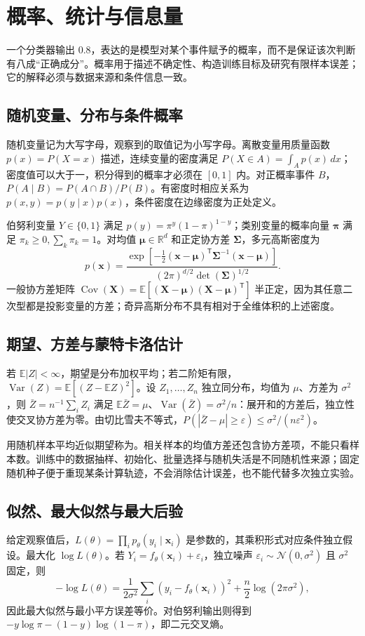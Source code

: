 \documentclass[UTF8,12pt,a4paper,fontset=fandol]{ctexbook}
\begin{document}
\chapter{概率、统计与信息量}
\label{chap:dl-probability}
一个分类器输出 $0.8$，表达的是模型对某个事件赋予的概率，而不是保证该次判断有八成“正确成分”。概率用于描述不确定性、构造训练目标及研究有限样本误差；它的解释必须与数据来源和条件信息一致。

\section{随机变量、分布与条件概率}
随机变量记为大写字母，观察到的取值记为小写字母。离散变量用质量函数 $p(x)=P(X=x)$ 描述，连续变量的密度满足 $P(X\in A)=\int_Ap(x)\,dx$；密度值可以大于一，积分得到的概率才必须在 $[0,1]$ 内。对正概率事件 $B$，$P(A\mid B)=P(A\cap B)/P(B)$。有密度时相应关系为 $p(x,y)=p(y\mid x)p(x)$，条件密度在边缘密度为正处定义。

伯努利变量 $Y\in\{0,1\}$ 满足 $p(y)=\pi^y(1-\pi)^{1-y}$；类别变量的概率向量 $\boldsymbol\pi$ 满足 $\pi_k\geq0,\sum_k\pi_k=1$。对均值 $\boldsymbol\mu\in\mathbb R^d$ 和正定协方差 $\boldsymbol\Sigma$，多元高斯密度为
\[
p(\mathbf x)=\frac{\exp[-\frac12(\mathbf x-\boldsymbol\mu)^\mathsf T\boldsymbol\Sigma^{-1}(\mathbf x-\boldsymbol\mu)]}{(2\pi)^{d/2}\det(\boldsymbol\Sigma)^{1/2}}.
\]
一般协方差矩阵 $\operatorname{Cov}(\mathbf X)=\mathbb E[(\mathbf X-\boldsymbol\mu)(\mathbf X-\boldsymbol\mu)^\mathsf T]$ 半正定，因为其任意二次型都是投影变量的方差；奇异高斯分布不具有相对于全维体积的上述密度。

\section{期望、方差与蒙特卡洛估计}
若 $\mathbb E|Z|<\infty$，期望是分布加权平均；若二阶矩有限，$\operatorname{Var}(Z)=\mathbb E[(Z-\mathbb EZ)^2]$。设 $Z_1,\ldots,Z_n$ 独立同分布，均值为 $\mu$、方差为 $\sigma^2$，则 $\bar Z=n^{-1}\sum_iZ_i$ 满足 $\mathbb E\bar Z=\mu$、$\operatorname{Var}(\bar Z)=\sigma^2/n$：展开和的方差后，独立性使交叉协方差为零。由切比雪夫不等式，$P(|\bar Z-\mu|\geq\varepsilon)\leq\sigma^2/(n\varepsilon^2)$。

用随机样本平均近似期望称为。相关样本的均值方差还包含协方差项，不能只看样本数。训练中的数据抽样、初始化、批量选择与随机失活是不同随机性来源；固定随机种子便于重现某条计算轨迹，不会消除估计误差，也不能代替多次独立实验。

\section{似然、最大似然与最大后验}
给定观察值后，$L(\theta)=\prod_ip_\theta(y_i\mid\mathbf x_i)$ 是参数的，其乘积形式对应条件独立假设。最大化 $\log L(\theta)$。若 $Y_i=f_\theta(\mathbf x_i)+\varepsilon_i$，独立噪声 $\varepsilon_i\sim\mathcal N(0,\sigma^2)$ 且 $\sigma^2$ 固定，则
\[
-\log L(\theta)=\frac1{2\sigma^2}\sum_i(y_i-f_\theta(\mathbf x_i))^2+\frac n2\log(2\pi\sigma^2),
\]
因此最大似然与最小平方误差等价。对伯努利输出则得到 $-y\log\pi-(1-y)\log(1-\pi)$，即二元交叉熵。
\end{document}
